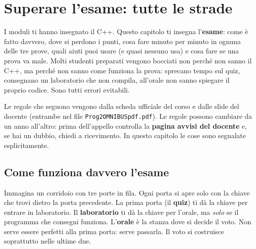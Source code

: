 \chapter{Superare l'esame: tutte le strade}

I moduli ti hanno insegnato il C++. Questo capitolo ti insegna l'\textbf{esame}: come è
fatto davvero, dove si perdono i punti, cosa fare minuto per minuto in ognuna delle tre
prove, quali aiuti puoi usare (e quasi nessuno usa) e cosa fare se una prova va male.
Molti studenti preparati vengono bocciati non perché non sanno il C++, ma perché non
sanno come funziona la prova: sprecano tempo sul quiz, consegnano un laboratorio che non
compila, all'orale non sanno spiegare il proprio codice. Sono tutti errori evitabili.

\begin{trappola}
Le regole che seguono vengono dalla scheda ufficiale del corso e dalle slide del docente
(entrambe nel file \texttt{Prog2OMNIBUSpdf.pdf}). Le regole possono cambiare da un anno
all'altro: prima dell'appello controlla la \textbf{pagina avvisi del docente} e, se hai un
dubbio, chiedi a ricevimento. In questo capitolo le cose  sono segnalate
esplicitamente.
\end{trappola}

\section{Come funziona davvero l'esame}

\begin{analogia}
Immagina un corridoio con tre porte in fila. Ogni porta si apre solo con la chiave che
trovi dietro la porta precedente. La prima porta (il \textbf{quiz}) ti dà la chiave per
entrare in laboratorio. Il \textbf{laboratorio} ti dà la chiave per l'orale, ma
\emph{solo} se il programma che consegni funziona. L'\textbf{orale} è la stanza dove si
decide il voto. Non serve essere perfetti alla prima porta: serve passarla. Il voto si
costruisce soprattutto nelle ultime due.
\end{analogia}

